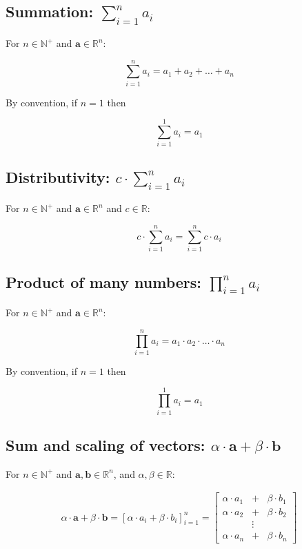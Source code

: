 \documentclass[titlepage]{article}
\begin{document}
      \subsection{Summation: $\sum_{i=1}^n a_i$}

        For $n \in \mathbb{N}^+$ and $\mathbf{a} \in \mathbb{R}^n$:

        $$\sum_{i=1}^n a_i = a_1 + a_2 + \ldots + a_n$$

        By convention, if $n=1$ then

        $$\sum_{i=1}^1 a_i = a_1$$

      \subsection{Distributivity: $c \cdot \sum_{i=1}^n a_i$}

        For $n \in \mathbb{N}^+$ and $\mathbf{a} \in \mathbb{R}^n$ and
        $c \in \mathbb{R}$:

        $$c \cdot \sum_{i=1}^n a_i = \sum_{i=1}^n c \cdot a_i$$

      \subsection{Product of many numbers: $\prod_{i=1}^n a_i$}

        For $n \in \mathbb{N}^+$ and $\mathbf{a} \in \mathbb{R}^n$:

        $$\prod_{i=1}^n a_i = a_1 \cdot a_2 \cdot \ldots \cdot a_n$$

        By convention, if $n=1$ then

        $$\prod_{i=1}^1 a_i = a_1$$

      \subsection{%
        Sum and scaling of vectors:
        $\alpha \cdot \mathbf{a} + \beta \cdot \mathbf{b}$
      }

        For $n \in \mathbb{N}^+$ and $\mathbf{a}, \mathbf{b} \in \mathbb{R}^n$,
        and $\alpha, \beta \in \mathbb{R}$:

        \begin{align*}
          \alpha \cdot \mathbf{a} + \beta \cdot \mathbf{b}
            = \left[ \alpha \cdot a_i + \beta \cdot b_i \right]_{i=1}^n
            = \begin{bmatrix}
                \alpha \cdot a_1 & + & \beta \cdot b_1 \\
                \alpha \cdot a_2 & + & \beta \cdot b_2 \\
                & \vdots & \\
                \alpha \cdot a_n & + & \beta \cdot b_n
              \end{bmatrix}
        \end{align*}
\end{document}
